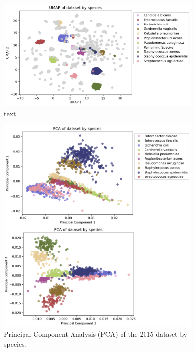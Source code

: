 \documentclass[english,11pt,a4paper,titlepage]{article}
\begin{document}
\begin{figure}[h]
	\centering
	\includegraphics[width=0.9\textwidth]{img/UMAP_species.png}
	\caption{text}
	\label{fig:umap_remaining}
\end{figure}

\begin{figure}[h]
	\centering
	\includegraphics[width=0.9\textwidth]{img/PCA_species_2015.png}
	\caption{Principal Component Analysis (PCA) of the 2015 dataset by species.}
	\label{fig:pca_2015}
\end{figure}
\end{document}
